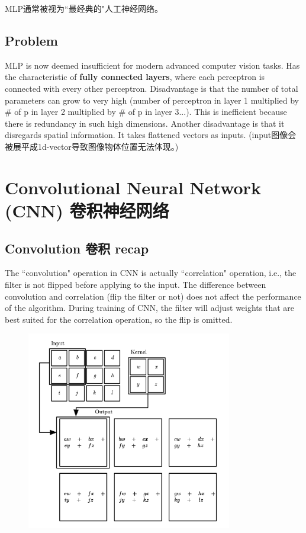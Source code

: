 \documentclass[11pt]{article}
\begin{document}
\begin{framed}
  \begin{center}
    MLP通常被视为``最经典的"人工神经网络。
  \end{center}
\end{framed}


\subsection{Problem}
MLP is now deemed insufficient for modern advanced computer vision tasks. Has the characteristic of \textbf{fully connected layers}, where each perceptron is connected with every other perceptron. Disadvantage is that the number of total parameters can grow to very high (number of perceptron in layer 1 multiplied by \# of p in layer 2 multiplied by \# of p in layer 3...). This is inefficient because there is redundancy in such high dimensions. Another disadvantage is that it disregards spatial information. It takes flattened vectors as inputs. (input图像会被展平成1d-vector导致图像物体位置无法体现。)


\section{Convolutional Neural Network (CNN) 卷积神经网络}

\subsection{Convolution 卷积 recap }
\begin{framed}
  \begin{center}
    The ``convolution" operation  in CNN is actually ``correlation" operation, i.e., the filter is not flipped before applying to the input. The difference between convolution and correlation (flip the filter or not) does not affect the performance of the algorithm. During training of CNN, the filter will adjust weights that are best suited for the correlation operation, so the flip is omitted.
  \end{center}
\end{framed}
\begin{figure}[hbt!]
  \centering
  \includegraphics[width=0.8\textwidth]{assets/cnn.png}
\end{figure}
\end{document}
